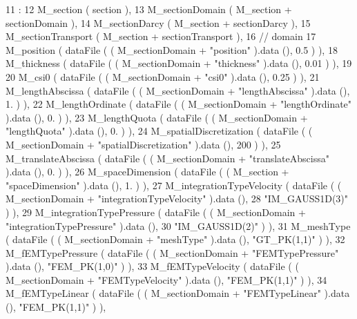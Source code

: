 \begin{DoxyCode}
11                                                                  :
12             M\_section ( section ),
13             M\_sectionDomain ( M\_section + sectionDomain ),
14             M\_sectionDarcy ( M\_section + sectionDarcy ),
15             M\_sectionTransport ( M\_section + sectionTransport ),
16             \textcolor{comment}{// domain}
17             M\_position ( dataFile ( ( M\_sectionDomain + \textcolor{stringliteral}{"position"} ).data (), 0.5 ) ),
18             M\_thickness ( dataFile ( ( M\_sectionDomain + \textcolor{stringliteral}{"thickness"} ).data (), 0.01 ) ),
19 
20             M\_csi0 ( dataFile ( ( M\_sectionDomain + \textcolor{stringliteral}{"csi0"} ).data (), 0.25 ) ),
21             M\_lengthAbscissa ( dataFile ( ( M\_sectionDomain + \textcolor{stringliteral}{"lengthAbscissa"} ).data (), 1. ) ),
22             M\_lengthOrdinate ( dataFile ( ( M\_sectionDomain + \textcolor{stringliteral}{"lengthOrdinate"} ).data (), 0. ) ),
23             M\_lengthQuota ( dataFile ( ( M\_sectionDomain + \textcolor{stringliteral}{"lengthQuota"} ).data (), 0. ) ),
24             M\_spatialDiscretization ( dataFile ( ( M\_sectionDomain + \textcolor{stringliteral}{"spatialDiscretization"} ).data (), 200
       ) ),
25             M\_translateAbscissa ( dataFile ( ( M\_sectionDomain + \textcolor{stringliteral}{"translateAbscissa"} ).data (), 0. ) ),
26             M\_spaceDimension ( dataFile ( ( M\_section + \textcolor{stringliteral}{"spaceDimension"} ).data (), 1. ) ),
27             M\_integrationTypeVelocity ( dataFile ( ( M\_sectionDomain + \textcolor{stringliteral}{"integrationTypeVelocity"} ).data (),
28                                                    \textcolor{stringliteral}{"IM\_GAUSS1D(3)"} ) ),
29             M\_integrationTypePressure ( dataFile ( ( M\_sectionDomain + \textcolor{stringliteral}{"integrationTypePressure"} ).data (),
30                                                    \textcolor{stringliteral}{"IM\_GAUSS1D(2)"} ) ),
31             M\_meshType ( dataFile ( ( M\_sectionDomain + \textcolor{stringliteral}{"meshType"} ).data (), \textcolor{stringliteral}{"GT\_PK(1,1)"} ) ),
32             M\_fEMTypePressure ( dataFile ( ( M\_sectionDomain + \textcolor{stringliteral}{"FEMTypePressure"} ).data (), \textcolor{stringliteral}{"FEM\_PK(1,0)"} )
       ),
33             M\_fEMTypeVelocity ( dataFile ( ( M\_sectionDomain + \textcolor{stringliteral}{"FEMTypeVelocity"} ).data (), \textcolor{stringliteral}{"FEM\_PK(1,1)"} )
       ),
34             M\_fEMTypeLinear ( dataFile ( ( M\_sectionDomain + \textcolor{stringliteral}{"FEMTypeLinear"} ).data (), \textcolor{stringliteral}{"FEM\_PK(1,1)"} ) ),

\end{DoxyCode}
